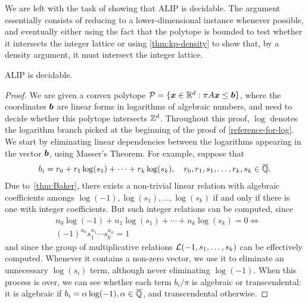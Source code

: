 We are left with the task of showing that ALIP is decidable. The argument essentially consists of reducing to a lower-dimensional instance whenever possible, and eventually either using the fact that the polytope is bounded to test whether it intersects the integer lattice or using \cref{thm:kp-density} to show that, by a density argument, it must intersect the integer lattice.

\begin{theorem}
ALIP is decidable.
\end{theorem}

\begin{proof}
We are given a convex polytope $\mathcal{P}=\lbrace \boldsymbol{x} \in \mathbb{R}^{d} : \pi A \boldsymbol{x} \leq \boldsymbol{b} \rbrace$, where the coordinates $\boldsymbol{b}$ are linear forms in logarithms of algebraic numbers, and need to decide whether this polytope intersects $\mathbb{Z}^{d}$. Throughout this proof, $\log$ denotes the logarithm branch picked at the beginning of the proof of \cref{reference-for-log}.
We start by eliminating linear dependencies between the logarithms appearing in the vector $\boldsymbol{b}$, using Masser's Theorem.
For example, suppose that
\begin{align*}
b_{i} = r_{0} + r_{1} \log(s_{1}) + \cdots + r_{k} \log(s_{k}), \quad r_{0}, r_{1}, s_{1}, \ldots, r_{k}, s_{k} \in \overline{\mathbb{Q}}.
\end{align*}
Due to~\cref{thm:Baker}, there exists a non-trivial linear relation with algebraic coefficients amongs $\log(-1), \log(s_{1}), \ldots, \log(s_{k})$ if and only if there is one with integer coefficients. But such integer relations can be computed, since
\begin{align*}
&n_{0} \log(-1) + n_{1} \log(s_{1}) + \cdots + n_{k} \log(s_{k}) = 0 \Leftrightarrow \\
&{(-1)}^{n_{0}} s_{1}^{n_{1}} \cdots s_{k}^{n_{k}} = 1
\end{align*}
and since the group of multiplicative relations ${\cal{L}}(-1, s_{1}, \ldots, s_{k})$ can be effectively computed. Whenever it contains a non-zero vector, we use it to eliminate an unnecessary $\log(s_{i})$ term, although never eliminating $\log(-1)$. When this process is over, we can see whether each term $b_{i}/\pi$ is algebraic or transcendental: it is algebraic if $b_{i} = \alpha \log(-1), \alpha \in \overline{\mathbb{Q}}$, and transcendental otherwise.


\end{proof}
